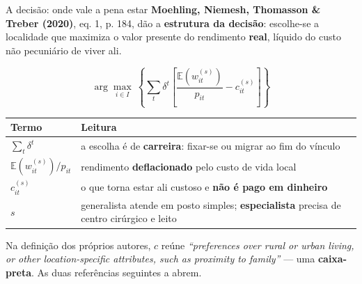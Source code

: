 \documentclass[aspectratio=169,11pt]{beamer}
\def\rastreiotexto{}
\newcommand{\rastreio}[1]{\gdef\rastreiotexto{#1}}
\newcommand{\lead}[1]{{\color{verdeEscuro}\bfseries #1}}
\renewcommand{\arraystretch}{1.18}
\begin{document}
\begin{frame}{A decisão: onde vale a pena estar}
  \vspace{0.2em}
  {\small \textbf{Moehling, Niemesh, Thomasson \& Treber (2020)}, eq. 1,
  p. 184, dão a \lead{estrutura da decisão}: escolhe-se a localidade que
  maximiza o valor presente do rendimento \textbf{real}, líquido do custo não
  pecuniário de viver ali.}

  \vspace{-0.3em}
  \[
    \arg\max_{i \in I}\ \left\{ \sum_t \delta^t
    \left[ \dfrac{\mathbb{E}\!\left(w_{it}^{(s)}\right)}{p_{it}}
    - c_{it}^{(s)} \right] \right\}
  \]
  \vspace{-1.0em}

  {\footnotesize\renewcommand{\arraystretch}{1.25}
  \begin{tabularx}{\textwidth}{@{}>{\centering\arraybackslash}p{} L@{}}
    \toprule
    \bfseries Termo & \bfseries Leitura \\
    \midrule
    $\sum_t \delta^t$ & a escolha é de \textbf{carreira}: fixar-se ou migrar ao
      fim do vínculo \\
    $\mathbb{E}(w^{(s)}_{it}) / p_{it}$ & rendimento \textbf{deflacionado} pelo
      custo de vida local \\
    $c^{(s)}_{it}$ & o que torna estar ali custoso e \textbf{não é pago em
      dinheiro} \\
    $s$ & generalista atende em posto simples; \textbf{especialista} precisa de
      centro cirúrgico e leito \\
    \bottomrule
  \end{tabularx}}

  \vspace{0.6em}
  {\footnotesize Na definição dos próprios autores, $c$ reúne
  \textit{``preferences over rural or urban living, or other location-specific
  attributes, such as proximity to family''} --- uma \lead{caixa-preta}. As
  duas referências seguintes a abrem.}
\end{frame}

\rastreio{3. Literatura teórica \textperiodcentered\ 2 de 2}
\end{document}
